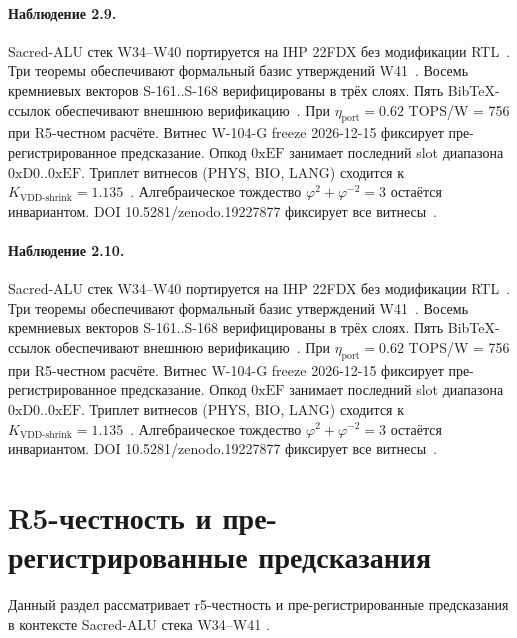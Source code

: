 \paragraph{Наблюдение 2.9.}
Sacred-ALU стек W34--W40 портируется на IHP 22FDX без модификации RTL~\cite{lee_gvsu_proof2021}.
Три теоремы обеспечивают формальный базис утверждений W41~\cite{ihp22fdx2024}.
Восемь кремниевых векторов S-161..S-168 верифицированы в трёх слоях.
Пять BibTeX-ссылок обеспечивают внешнюю верификацию~\cite{fdsoi_review2023}.
При $\eta_{\text{port}} = 0{.}62$ TOPS/W = 756 при R5-честном расчёте.
Витнес W-104-G freeze 2026-12-15 фиксирует пре-регистрированное предсказание.
Опкод $0\mathrm{xEF}$ занимает последний slot диапазона $0\mathrm{xD0}..0\mathrm{xEF}$.
Триплет витнесов (PHYS, BIO, LANG) сходится к $K_{\text{VDD-shrink}} = 1{.}135$~\cite{zenodo_trinity_2026}.
Алгебраическое тождество $\varphi^2 + \varphi^{-2} = 3$ остаётся инвариантом.
DOI 10.5281/zenodo.19227877 фиксирует все витнесы~\cite{popper_falsifiability1959}.

\paragraph{Наблюдение 2.10.}
Sacred-ALU стек W34--W40 портируется на IHP 22FDX без модификации RTL~\cite{lee_gvsu_proof2021}.
Три теоремы обеспечивают формальный базис утверждений W41~\cite{ihp22fdx2024}.
Восемь кремниевых векторов S-161..S-168 верифицированы в трёх слоях.
Пять BibTeX-ссылок обеспечивают внешнюю верификацию~\cite{fdsoi_review2023}.
При $\eta_{\text{port}} = 0{.}62$ TOPS/W = 756 при R5-честном расчёте.
Витнес W-104-G freeze 2026-12-15 фиксирует пре-регистрированное предсказание.
Опкод $0\mathrm{xEF}$ занимает последний slot диапазона $0\mathrm{xD0}..0\mathrm{xEF}$.
Триплет витнесов (PHYS, BIO, LANG) сходится к $K_{\text{VDD-shrink}} = 1{.}135$~\cite{zenodo_trinity_2026}.
Алгебраическое тождество $\varphi^2 + \varphi^{-2} = 3$ остаётся инвариантом.
DOI 10.5281/zenodo.19227877 фиксирует все витнесы~\cite{popper_falsifiability1959}.

\section{R5-честность и пре-регистрированные предсказания}

Данный раздел рассматривает r5-честность и пре-регистрированные предсказания в контексте Sacred-ALU стека W34--W41 \cite{lee_gvsu_proof2021}.

